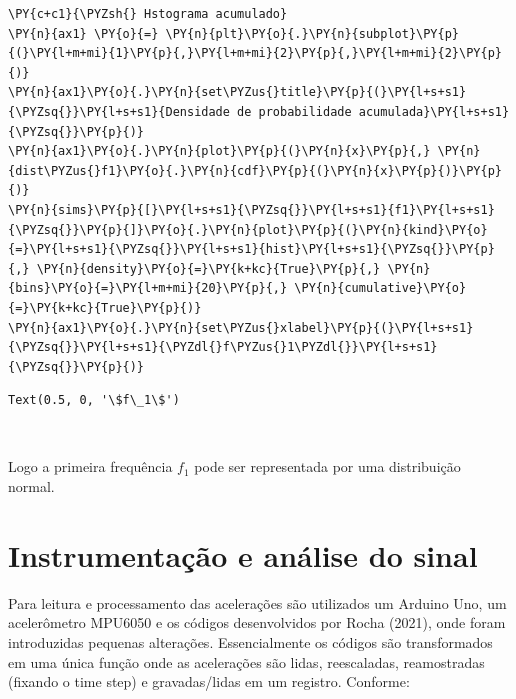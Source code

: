 \begin{tcolorbox}[breakable, size=fbox, boxrule=1pt, pad at break*=1mm,colback=cellbackground, colframe=cellborder]
\begin{Verbatim}[commandchars=\\\{\}]
\PY{c+c1}{\PYZsh{} Hstograma acumulado}
\PY{n}{ax1} \PY{o}{=} \PY{n}{plt}\PY{o}{.}\PY{n}{subplot}\PY{p}{(}\PY{l+m+mi}{1}\PY{p}{,}\PY{l+m+mi}{2}\PY{p}{,}\PY{l+m+mi}{2}\PY{p}{)}
\PY{n}{ax1}\PY{o}{.}\PY{n}{set\PYZus{}title}\PY{p}{(}\PY{l+s+s1}{\PYZsq{}}\PY{l+s+s1}{Densidade de probabilidade acumulada}\PY{l+s+s1}{\PYZsq{}}\PY{p}{)}
\PY{n}{ax1}\PY{o}{.}\PY{n}{plot}\PY{p}{(}\PY{n}{x}\PY{p}{,} \PY{n}{dist\PYZus{}f1}\PY{o}{.}\PY{n}{cdf}\PY{p}{(}\PY{n}{x}\PY{p}{)}\PY{p}{)}
\PY{n}{sims}\PY{p}{[}\PY{l+s+s1}{\PYZsq{}}\PY{l+s+s1}{f1}\PY{l+s+s1}{\PYZsq{}}\PY{p}{]}\PY{o}{.}\PY{n}{plot}\PY{p}{(}\PY{n}{kind}\PY{o}{=}\PY{l+s+s1}{\PYZsq{}}\PY{l+s+s1}{hist}\PY{l+s+s1}{\PYZsq{}}\PY{p}{,} \PY{n}{density}\PY{o}{=}\PY{k+kc}{True}\PY{p}{,} \PY{n}{bins}\PY{o}{=}\PY{l+m+mi}{20}\PY{p}{,} \PY{n}{cumulative}\PY{o}{=}\PY{k+kc}{True}\PY{p}{)}
\PY{n}{ax1}\PY{o}{.}\PY{n}{set\PYZus{}xlabel}\PY{p}{(}\PY{l+s+s1}{\PYZsq{}}\PY{l+s+s1}{\PYZdl{}f\PYZus{}1\PYZdl{}}\PY{l+s+s1}{\PYZsq{}}\PY{p}{)}
\end{Verbatim}
\end{tcolorbox}

            \begin{tcolorbox}[breakable, size=fbox, boxrule=.5pt, pad at break*=1mm, opacityfill=0]
\begin{Verbatim}[commandchars=\\\{\}]
Text(0.5, 0, '\$f\_1\$')
\end{Verbatim}
\end{tcolorbox}
        
    \begin{center}
    \end{center}
    { \hspace*{\fill} \\}
    
    Logo a primeira frequência \(f_1\) pode ser representada por uma
distribuição normal.

    \hypertarget{instrumentauxe7uxe3o-e-anuxe1lise-do-sinal}{%
\section{Instrumentação e análise do
sinal}\label{instrumentauxe7uxe3o-e-anuxe1lise-do-sinal}}

Para leitura e processamento das acelerações são utilizados um Arduino
Uno, um acelerômetro MPU6050 e os códigos desenvolvidos por Rocha
(2021), onde foram introduzidas pequenas alterações. Essencialmente os
códigos são transformados em uma única função onde as acelerações são
lidas, reescaladas, reamostradas (fixando o time step) e gravadas/lidas
em um registro. Conforme:

